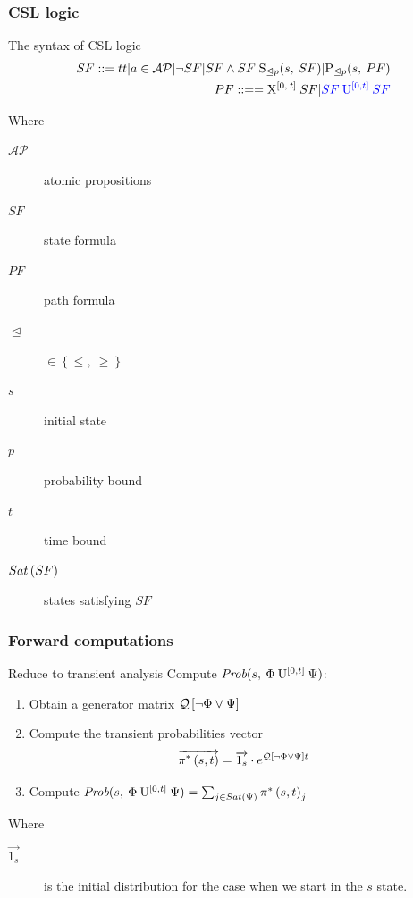 \documentclass{beamer}
\begin{document}
\frame
{
	\frametitle{CSL logic \cite{BaierHHK_TSE03}}

	\begin{alertblock}{The syntax of CSL logic}
		\begin{eqnarray}
			SF ::= tt | a \in \mathcal{AP}| \lnot SF | SF \wedge SF | \SpsP{p}{s}{SF} | \PZsf{\trianglelefteq p}{s}{PF}  \nonumber \\
			PF ::== \Xp{0}{t}{SF} | \color[rgb]{0,0,1}{\ppUp{SF}{0}{t}{SF}} \nonumber
		\end{eqnarray}
	\end{alertblock}
	
	\begin{block}{Where}
		{\small
		\begin{minipage}[t]{0.5\linewidth}
			\begin{description}
				\item[$\mathcal{AP}$] atomic propositions
				\item[$SF$] state formula
				\item[$PF$] path formula
				\item[$\trianglelefteq$] $\in \left\{ \leq, \: \geq \right\}$
			\end{description}
		\end{minipage} \hfill
		\begin{minipage}[t]{0.48\linewidth}
			\begin{description}
				\item[$s$] initial state
				\item[$p$] probability bound
				\item[$t$] time bound
				\item[$Sat \left(SF \right)$] states satisfying $SF$
			\end{description}
		\end{minipage}
		}
	\end{block}
}
	
\frame
{
	\frametitle{Forward computations \cite{BaierHHK_TSE03}}
	\begin{alertblock}{Reduce to transient analysis}
		Compute $\mbox{\it Prob}(s, \: \Phi \: \mathrm{U}^{[0,t]} \: \Psi )$:
		\begin{enumerate}
			\item Obtain a generator matrix $\mathcal{Q}\left[\lnot \Phi \vee \Psi \right]$
			\item Compute the transient probabilities vector
				\begin{equation}
					\overrightarrow{\pi^{*} \left(s, t \right)} = \overrightarrow{1_{s}} \cdot e^{\mathcal{Q}\left[\lnot \Phi \vee \Psi \right] t}
					\label{eq:fsmc_base}
				\end{equation}
			\item Compute $\mbox{\it Prob}(s, \: \Phi \: \mathrm{U}^{[0,t]} \: \Psi ) = \sum_{j \in Sat \left(\Psi \right)}\pi^{*} \left(s, t \right)_{j}$ \label{al:step_3}
		\end{enumerate}
	\end{alertblock}
	
	\begin{block}{Where}
		\begin{description}
			\item[$\overrightarrow{1_{s}}$] is the initial distribution for the case when we start in the $s$ state.
		\end{description}
	\end{block}
}
	
\end{document}

